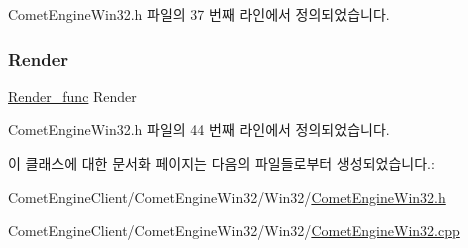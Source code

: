 Comet\+Engine\+Win32.\+h 파일의 37 번째 라인에서 정의되었습니다.

\mbox{\label{class_comet_engine_1_1_comet_engine_win32_a805efc6c9b43dd5daa64e3c1392d18b3}} 
\subsubsection{\texorpdfstring{Render}{Render}}
{\footnotesize\ttfamily \hyperlink{class_comet_engine_1_1_comet_engine_win32_a97e4f6f1bfb397686ef973fe8bd42abf}{Render\+\_\+func} Render\hspace{0.3cm}{\ttfamily [private]}}



Comet\+Engine\+Win32.\+h 파일의 44 번째 라인에서 정의되었습니다.



이 클래스에 대한 문서화 페이지는 다음의 파일들로부터 생성되었습니다.\+:\begin{DoxyCompactItemize}
\item 
Comet\+Engine\+Client/\+Comet\+Engine\+Win32/\+Win32/\hyperlink{_comet_engine_win32_8h}{Comet\+Engine\+Win32.\+h}\item 
Comet\+Engine\+Client/\+Comet\+Engine\+Win32/\+Win32/\hyperlink{_comet_engine_win32_8cpp}{Comet\+Engine\+Win32.\+cpp}\end{DoxyCompactItemize}
